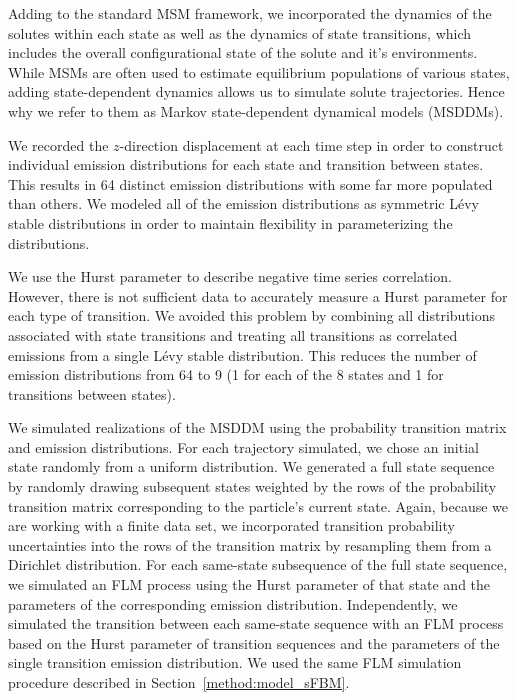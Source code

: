 \documentclass[journal=jctcce,manuscript=article]{achemso}
\begin{document}
  Adding to the standard MSM framework, we incorporated the dynamics of the
  solutes within each state as well as the dynamics of state transitions, which
  includes the overall configurational state of the solute and it's
  environments. While MSMs are often used to estimate equilibrium populations
  of various states, adding state-dependent dynamics allows us to simulate
  solute trajectories. Hence why we refer to them as Markov state-dependent
  dynamical models (MSDDMs). 
  
  We recorded the $z$-direction displacement at each time step in order to
  construct individual emission distributions for each state and transition
  between states. This results in 64 distinct emission distributions with some
  far more populated than others. We modeled all of the emission distributions
  as symmetric L\'evy stable distributions in order to maintain flexibility in
  parameterizing the distributions.
  
  We use the Hurst parameter to describe negative time series correlation.
  However, there is not sufficient data to accurately measure a Hurst parameter
  for each type of transition. We avoided this problem by combining all
  distributions associated with state transitions and treating all transitions
  as correlated emissions from a single L\'evy stable distribution. This
  reduces the number of emission distributions from 64 to 9 (1 for each of the
  8 states and 1 for transitions between states).  
  
  We simulated realizations of the MSDDM using the probability transition
  matrix and emission distributions. For each trajectory simulated, we chose an
  initial state randomly from a uniform distribution. We generated a full state
  sequence by randomly drawing subsequent states weighted by the rows of the
  probability transition matrix corresponding to the particle's current state.
  Again, because we are working with a finite data set, we incorporated
  transition probability uncertainties into the rows of the transition matrix
  by resampling them from a Dirichlet distribution. For each same-state
  subsequence of the full state sequence, we simulated an FLM process using the
  Hurst parameter of that state and the parameters of the corresponding
  emission distribution. Independently, we simulated the transition between
  each same-state sequence with an FLM process based on the Hurst parameter of
  transition sequences and the parameters of the single transition emission
  distribution. We used the same FLM simulation procedure described in
  Section~\ref{method:model_sFBM}.
\end{document}
